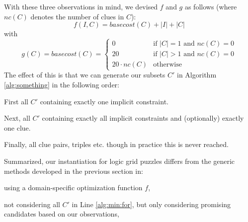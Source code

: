 With these three observations in mind, we devised $f$ and $g$ as follows (where $nc(C)$ denotes the number of clues in $C$): \label{sec:cost}
\[f(I,C) = basecost(C) + |I| + |C|\] with 
\[g(C) = basecost(C) = \left\{\begin{array}{ll}
                               0 & \text{if $|C|=1$ and $nc(C) = 0$}\\
                               20 & \text{if $|C|>1$ and $nc(C)=0$}\\
                               20\cdot nc(C) & \text{otherwise}
                              \end{array}\right.
                              \]
The effect of this is that we can generate our subsets $C'$ in Algorithm \ref{alg:something} in the following order:

\begin{compactitem}
 \item First all $C'$ containing exactly one implicit constraint.
 \item Next, all $C'$ containing exactly all implicit constraints and (optionally) exactly one clue.
 \item Finally, all clue pairs, triples etc. though in practice this is never reached.
\end{compactitem}
Summarized, our instantiation for logic grid puzzles differs from the generic methods developed in the previous section in:
\begin{compactitem}
 \item using a domain-specific optimization function $f$, 
 \item not considering all $C'$ in Line \ref{alg:min:for}, but only considering promising candidates based on our observations,
 \item 
\end{compactitem}




